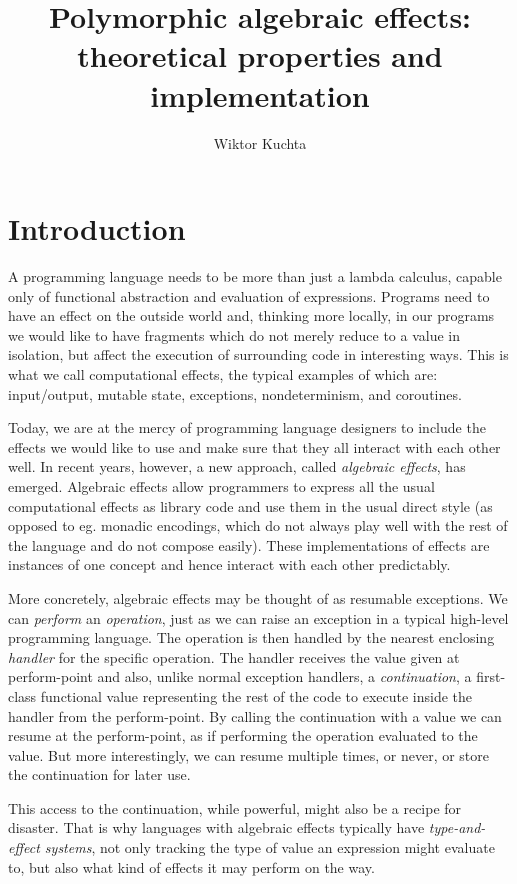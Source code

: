 \documentclass[a4paper, 12pt]{report}
\title{Polymorphic algebraic effects: theoretical properties and implementation}
\author{Wiktor Kuchta}
\date{\vspace{-4ex}}
\newcommand{\+}{\enspace}
\begin{document}
\maketitle

\chapter{Introduction}
A programming language needs to be more than just a lambda calculus,
capable only of functional abstraction and evaluation of expressions.
Programs need to have an effect on the outside world and, thinking more locally,
in our programs we would like to have fragments which do not merely reduce to a value in isolation,
but affect the execution of surrounding code in interesting ways.
This is what we call computational effects, the typical examples of which are:
input/output, mutable state, exceptions, nondeterminism, and coroutines.

Today, we are at the mercy of programming language designers to include the
effects we would like to use and make sure that they all interact with
each other well.
In recent years, however, a new approach, called \textit{algebraic effects}, has emerged.
Algebraic effects allow programmers to express all the usual computational effects as library code
and use them in the usual direct style (as opposed to eg. monadic encodings,
which do not always play well with the rest of the language and do not compose easily).
These implementations of effects are instances of one concept and hence interact
with each other predictably.

More concretely, algebraic effects may be thought of as resumable exceptions.
We can \textit{perform} an \textit{operation},
just as we can raise an exception in a typical high-level programming language.
The operation is then handled by the nearest enclosing \textit{handler} for the specific operation.
The handler receives the value given at perform-point and also,
unlike normal exception handlers,
a \textit{continuation}, a first-class functional value representing the rest
of the code to execute inside the handler from the perform-point.
By calling the continuation with a value we can resume at the perform-point,
as if performing the operation evaluated to the value.
But more interestingly, we can resume multiple times, or never, or store the continuation for later use.

This access to the continuation, while powerful, might also be a recipe for disaster.
That is why languages with algebraic effects typically have
\textit{type-and-effect systems},
not only tracking the type of value an expression might evaluate to, but also
what kind of effects it may perform on the way.
\end{document}
